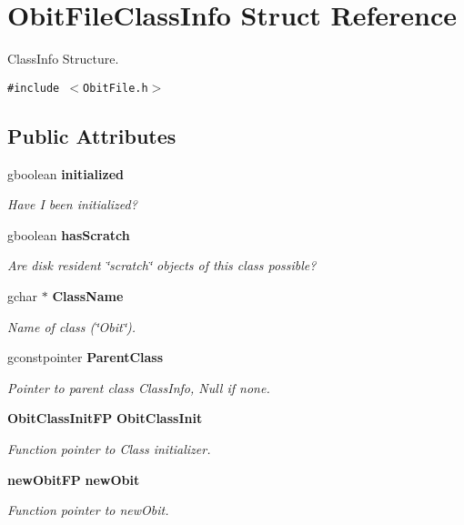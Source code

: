 \section{Obit\-File\-Class\-Info Struct Reference}
\label{structObitFileClassInfo}
Class\-Info Structure.  


{\tt \#include $<$Obit\-File.h$>$}

\subsection*{Public Attributes}
\begin{CompactItemize}
\item 
gboolean {\bf initialized}
\begin{CompactList}\small\item\em Have I been initialized? \item\end{CompactList}\item 
gboolean {\bf has\-Scratch}
\begin{CompactList}\small\item\em Are disk resident \char`\"{}scratch\char`\"{} objects of this class possible? \item\end{CompactList}\item 
gchar $\ast$ {\bf Class\-Name}
\begin{CompactList}\small\item\em Name of class (\char`\"{}Obit\char`\"{}). \item\end{CompactList}\item 
gconstpointer {\bf Parent\-Class}
\begin{CompactList}\small\item\em Pointer to parent class Class\-Info, Null if none. \item\end{CompactList}\item 
{\bf Obit\-Class\-Init\-FP} {\bf Obit\-Class\-Init}
\begin{CompactList}\small\item\em Function pointer to Class initializer. \item\end{CompactList}\item 
{\bf new\-Obit\-FP} {\bf new\-Obit}
\begin{CompactList}\small\item\em Function pointer to new\-Obit. \item\end{CompactList}\item 

\end{CompactItemize}
